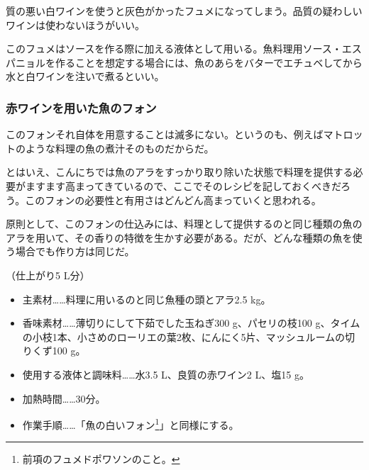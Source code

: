 \begin{recette}
質の悪い白ワインを使うと灰色がかったフュメになってしまう。品質の疑わしいワインは使わないほうがいい。

このフュメはソースを作る際に加える液体として用いる。魚料理用ソース・エスパニョルを作ることを想定する場合には、魚のあらをバターでエチュベしてから水と白ワインを注いで煮るといい。

\atoaki{}

\hypertarget{fonds-de-poisson-au-vin-rouge}{%
\subsubsection{赤ワインを用いた魚のフォン}\label{fonds-de-poisson-au-vin-rouge}}



このフォンそれ自体を用意することは滅多にない。というのも、例えばマトロットのような料理の魚の煮汁そのものだからだ。

とはいえ、こんにちでは魚のアラをすっかり取り除いた状態で料理を提供する必要がますます高まってきているので、ここでそのレシピを記しておくべきだろう。このフォンの必要性と有用さはどんどん高まっていくと思われる。

原則として、このフォンの仕込みには、料理として提供するのと同じ種類の魚のアラを用いて、その香りの特徴を生かす必要がある。だが、どんな種類の魚を使う場合でも作り方は同じだ。

（仕上がり5 L分）

\begin{itemize}
\item
  主素材\ldots{}\ldots{}料理に用いるのと同じ魚種の頭とアラ2.5 kg。
\item
  香味素材\ldots{}\ldots{}薄切りにして下茹でした玉ねぎ300
  g、パセリの枝100
  g、タイムの小枝1本、小さめのローリエの葉2枚、にんにく5片、マッシュルームの切りくず100
  g。
\item
  使用する液体と調味料\ldots{}\ldots{}水3.5 L、良質の赤ワイン2 L、塩15
  g。
\item
  加熱時間\ldots{}\ldots{}30分。
\item
  作業手順\ldots{}\ldots{}「魚の白いフォン\footnote{前項のフュメドポワソンのこと。}」と同様にする。
\end{itemize}


\end{recette}
